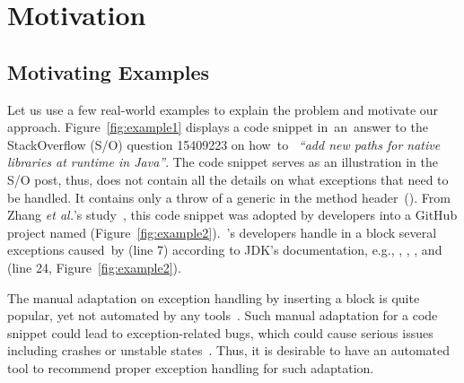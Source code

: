 \section{Motivation}
\label{motiv:sec}

\subsection{Motivating Examples}
\label{examples:sec}



Let us use a few real-world examples to explain the problem and
motivate our approach. Figure~\ref{fig:example1} displays a code
snippet in~an~answer to the StackOverflow (S/O) question 15409223 on
how~to~ {\em ``add new paths for native libraries at runtime in
  Java''}.  The code snippet serves as an illustration in the S/O
post, thus, does not contain all the details on what exceptions that
need to be handled. It contains only a throw of a generic
 in the method header~(). From
Zhang {\em et al.}'s study~\cite{zhang-icse19}, this code snippet was
adopted by developers into a GitHub project named 
(Figure~\ref{fig:example2}).~'s developers handle in a
 block several exceptions caused~by
 (line 7)
according to JDK's documentation, e.g.,
, ,
, and
 (line 24,
Figure~\ref{fig:example2}).

The manual adaptation on exception handling by inserting a
 block is quite popular, yet not automated by any
tools~\cite{zhang-icse19}. Such manual adaptation for a code snippet
could lead to exception-related bugs, which could cause serious issues
including crashes or unstable states~\cite{xrank-fse20}.
Thus, it is desirable to have an automated tool to recommend proper
exception handling for such adaptation.


